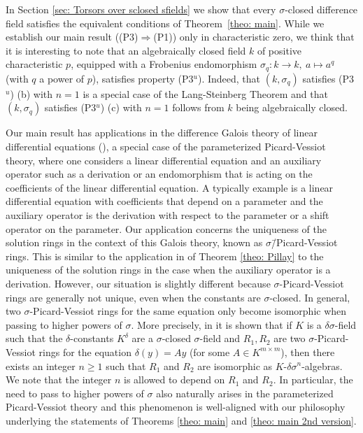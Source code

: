 \documentclass[oneside,reqno]{amsart}
\theoremstyle{definition}
\newcommand{\s}{\sigma}
\newcommand{\de}{\delta}
\newcommand{\kn}{k^{[n]}}
\newcommand{\pt}{{\rm{(P3$^u$)}}}
\newcommand{\poweak}{{\rm{(P1)}}}
\newcommand{\ptweak}{{\rm{(P3)}}}
\begin{document}
In Section \ref{sec: Torsors over sclosed sfields} we show that every $\s$-closed difference field satisfies the equivalent conditions of Theorem~\ref{theo: main}. While we establish our main result (\ptweak{}$\Rightarrow$\poweak{}) only in characteristic zero, we think that it is interesting to note that an algebraically closed field $k$ of positive characteristic $p$, equipped with a Frobenius endomorphism $\s_q\colon k\to k,\ a\mapsto a^q$ (with $q$ a power of $p$), satisfies property \pt{}. Indeed, that $(k,\s_q)$ satisfies \pt{} (b) with $n=1$ is a special case of the Lang-Steinberg Theorem and that $(k,\s_q)$ satisfies \pt{} (c) with $n=1$ follows from $k$ being algebraically closed. 


\medskip

Our main result has applications in the difference Galois theory of linear differential equations (\cite{DiVizioHardouinWibmer:DifferenceGaloisTheoryOfLinearDifferentialEquations}), a special case of the parameterized Picard-Vessiot theory, where one considers a linear differential equation and an auxiliary operator such as a derivation or an endomorphism that is acting on the coefficients of the linear differential equation. A typically example is a linear differential equation with coefficients that depend on a parameter and the auxiliary operator is the derivation with respect to the parameter or a shift operator on the parameter.
Our application concerns the uniqueness of the solution rings in the context of this Galois theory, known as $\s$\=/Picard-Vessiot rings.
This is similar to the application in \cite[Cor. 1.4]{Pillay:ThePicardVessiotTheoryConstrainedCohomology} of Theorem \ref{theo: Pillay} to the uniqueness of the solution rings in the case when the auxiliary operator is a derivation. However, our situation is slightly different because $\s$-Picard-Vessiot rings are generally not unique, even when the constants are $\s$-closed. In general, two $\s$-Picard-Vessiot rings for the same equation only become isomorphic when passing to higher powers of $\s$. More precisely, in \cite[Cor. 1.17]{DiVizioHardouinWibmer:DifferenceGaloisTheoryOfLinearDifferentialEquations} it is shown that if $K$ is a $\de\s$-field such that the $\de$-constants $K^\de$ are a $\s$-closed $\s$-field and $R_1,R_2$ are two $\s$-Picard-Vessiot rings for the equation $\de(y)=Ay$ (for some $A\in K^{m\times m}$), then there exists an integer $n\geq 1$ such that $R_1$ and $R_2$ are isomorphic as $K$-$\de\s^n$-algebras. We note that the integer $n$ is allowed to depend on $R_1$ and $R_2$. In particular, the need to pass to higher powers of $\s$ also naturally arises in the parameterized Picard-Vessiot theory and this phenomenon is well-aligned with our philosophy underlying the statements of Theorems \ref{theo: main} and \ref{theo: main 2nd version}. 
\end{document}
